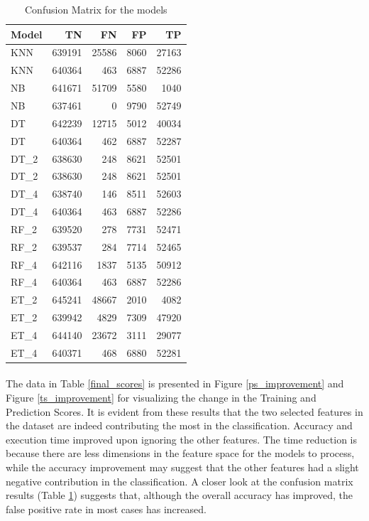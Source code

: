 \begin{table}
    \caption{Confusion Matrix for the models}
    \centering
    \label{confusion_matrix}
    \begin{tabular}{| l | r | r | r | r |}
        \hline
        \textbf{Model} & \textbf{TN} & \textbf{FN} & \textbf{FP} & \textbf{TP} \\
        \hline
        KNN & 639191 & 25586 & 8060 & 27163 \\
        \hline
        KNN & 640364 & 463 & 6887 & 52286 \\
        \hline
        NB & 641671 & 51709 & 5580 & 1040 \\
        \hline
        NB & 637461 & 0 & 9790 & 52749 \\
        \hline
        DT & 642239 & 12715 & 5012 & 40034 \\
        \hline
        DT & 640364 & 462 & 6887 & 52287 \\
        \hline
        DT\_2 & 638630 & 248 & 8621 & 52501 \\
        \hline
        DT\_2 & 638630 & 248 & 8621 & 52501 \\
        \hline
        DT\_4 & 638740 & 146 & 8511 & 52603 \\
        \hline
        DT\_4 & 640364 & 463 & 6887 & 52286 \\
        \hline
        RF\_2 & 639520 & 278 & 7731 & 52471 \\
        \hline
        RF\_2 & 639537 & 284 & 7714 & 52465 \\
        \hline
        RF\_4 & 642116 & 1837 & 5135 & 50912 \\
        \hline
        RF\_4 & 640364 & 463 & 6887 & 52286 \\
        \hline
        ET\_2 & 645241 & 48667 & 2010 & 4082 \\
        \hline
        ET\_2 & 639942 & 4829 & 7309 & 47920 \\
        \hline
        ET\_4 & 644140 & 23672 & 3111 & 29077 \\
        \hline
        ET\_4 & 640371 & 468 & 6880 & 52281 \\
        \hline
    \end{tabular}
\end{table}

\paragraph{}
The data in Table \ref{final_scores} is presented in Figure \ref{ps_improvement} and Figure \ref{ts_improvement} for visualizing the change in the Training and Prediction Scores. It is evident from these results that the two selected features in the dataset are indeed contributing the most in the classification. Accuracy and execution time improved upon ignoring the other features. The time reduction is because there are less dimensions in the feature space for the models to process, while the accuracy improvement may suggest that the other features had a slight negative contribution in the classification. A closer look at the confusion matrix results (Table \ref{confusion_matrix}) suggests that, although the overall accuracy has improved, the false positive rate in most cases has increased.

